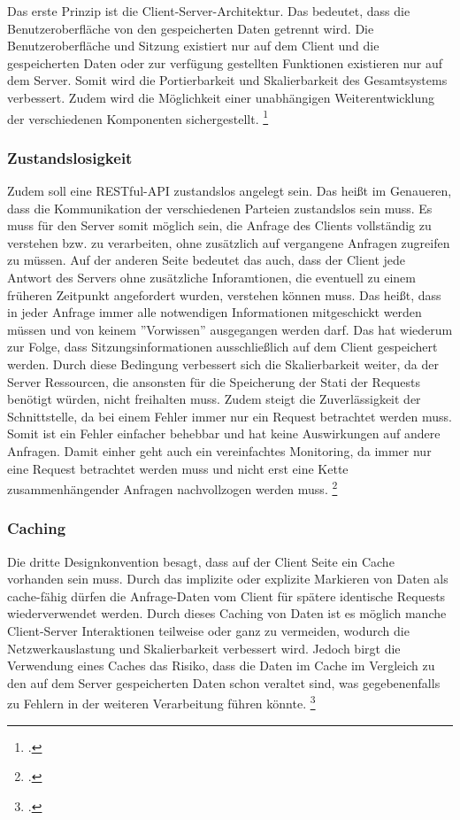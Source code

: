 Das erste Prinzip ist die Client-Server-Architektur. Das bedeutet, dass die Benutzeroberfläche von den gespeicherten Daten getrennt wird. Die Benutzeroberfläche und Sitzung existiert nur auf dem Client und die gespeicherten Daten oder zur verfügung gestellten Funktionen existieren nur auf dem Server. Somit wird die Portierbarkeit und Skalierbarkeit des Gesamtsystems verbessert. Zudem wird die Möglichkeit einer unabhängigen Weiterentwicklung der verschiedenen Komponenten sichergestellt. \footcite[Vgl.][]{fielding_architectural_2000}

\subsubsection{Zustandslosigkeit}

Zudem soll eine RESTful-API zustandslos angelegt sein. Das hei{\ss}t im Genaueren, dass die Kommunikation der verschiedenen Parteien zustandslos sein muss. Es muss für den Server somit möglich sein, die Anfrage des Clients vollständig zu verstehen bzw. zu verarbeiten, ohne zusätzlich auf vergangene Anfragen zugreifen zu müssen. Auf der anderen Seite bedeutet das auch, dass der Client jede Antwort des Servers ohne zusätzliche Inforamtionen, die eventuell zu einem früheren Zeitpunkt angefordert wurden, verstehen können muss. Das hei{\ss}t, dass in jeder Anfrage immer alle notwendigen Informationen mitgeschickt werden müssen und von keinem ''Vorwissen'' ausgegangen werden darf. Das hat wiederum zur Folge, dass Sitzungsinformationen ausschlie{\ss}lich auf dem Client gespeichert werden. Durch diese Bedingung verbessert sich die Skalierbarkeit weiter, da der Server Ressourcen, die ansonsten für die Speicherung der Stati der Requests benötigt würden, nicht freihalten muss. Zudem steigt die Zuverlässigkeit der Schnittstelle, da bei einem Fehler immer nur ein Request betrachtet werden muss. Somit ist ein Fehler einfacher behebbar und hat keine Auswirkungen auf andere Anfragen. Damit einher geht auch ein vereinfachtes Monitoring, da immer nur eine Request betrachtet werden muss und nicht erst eine Kette zusammenhängender Anfragen nachvollzogen werden muss. \footcite[Vgl.][]{fielding_architectural_2000}

\subsubsection{Caching}

Die dritte Designkonvention besagt, dass auf der Client Seite ein Cache vorhanden sein muss. Durch das implizite oder explizite Markieren von Daten als cache-fähig dürfen die Anfrage-Daten vom Client für spätere identische Requests wiederverwendet werden. Durch dieses Caching von Daten ist es möglich manche Client-Server Interaktionen teilweise oder ganz zu vermeiden, wodurch die Netzwerkauslastung und Skalierbarkeit verbessert wird. Jedoch birgt die Verwendung eines Caches das Risiko, dass die Daten im Cache im Vergleich zu den auf dem Server gespeicherten Daten schon veraltet sind, was gegebenenfalls zu Fehlern in der weiteren Verarbeitung führen könnte. \footcite[Vgl.][]{fielding_architectural_2000}

